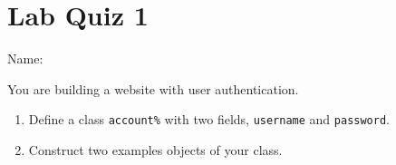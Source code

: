 \documentclass[12pt]{article}
\begin{document}
\section*{Lab Quiz 1}

\bigskip
Name: \underline{\hspace*{4in}}

\bigskip
\bigskip
\setlength{\parskip}{8pt}

You are building a website with user authentication.
\begin{enumerate}
\item Define a class \texttt{account\%} with two fields, \texttt{username} and
\texttt{password}.
\item Construct two examples objects of your class.
\end{enumerate}
\end{document}
